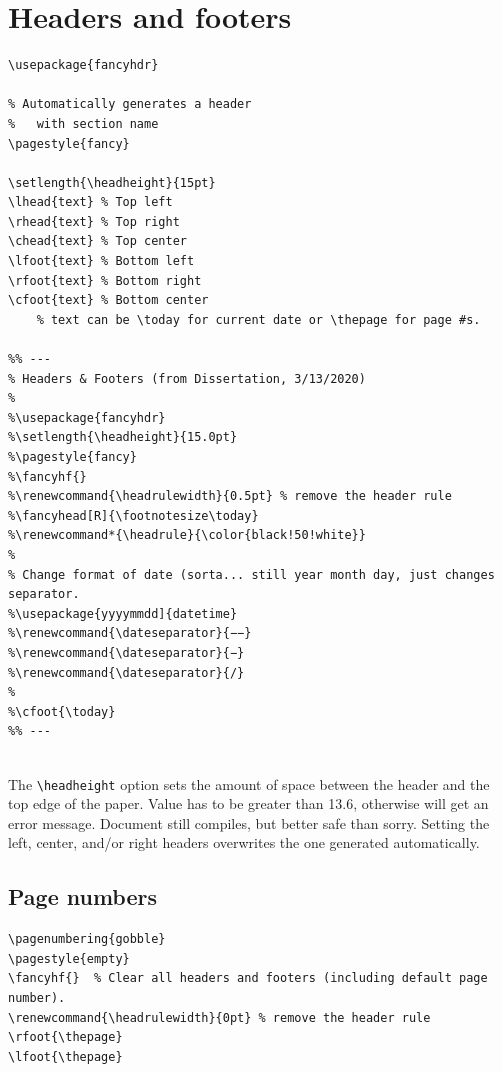 \documentclass{article}
\begin{document}
\section{Headers and footers}\label{headfoot}
\begin{minipage}{0.5\textwidth}
\begin{lstlisting}
\usepackage{fancyhdr}

% Automatically generates a header
%   with section name
\pagestyle{fancy}

\setlength{\headheight}{15pt}
\lhead{text} % Top left
\rhead{text} % Top right
\chead{text} % Top center
\lfoot{text} % Bottom left
\rfoot{text} % Bottom right
\cfoot{text} % Bottom center
    % text can be \today for current date or \thepage for page #s.

%% ---
% Headers & Footers (from Dissertation, 3/13/2020)
%
%\usepackage{fancyhdr}
%\setlength{\headheight}{15.0pt}
%\pagestyle{fancy}
%\fancyhf{}
%\renewcommand{\headrulewidth}{0.5pt} % remove the header rule
%\fancyhead[R]{\footnotesize\today}
%\renewcommand*{\headrule}{\color{black!50!white}}
%
% Change format of date (sorta... still year month day, just changes separator.
%\usepackage{yyyymmdd]{datetime}
%\renewcommand{\dateseparator}{−−}
%\renewcommand{\dateseparator}{−}
%\renewcommand{\dateseparator}{/}
%
%\cfoot{\today}
%% ---


\end{lstlisting}
\end{minipage}%
\begin{minipage}{0.5\textwidth}
    \begin{center}
        The \verb|\headheight| option sets the amount of space between the
        header and the top edge of the paper. Value has to be greater than
        13.6, otherwise will get an error message. Document still
        compiles, but better safe than sorry. Setting the left, center, and/or
        right headers overwrites the one generated automatically.
    \end{center}
\end{minipage}


\subsection{Page numbers}
\begin{lstlisting}
\pagenumbering{gobble}
\pagestyle{empty}
\fancyhf{}  % Clear all headers and footers (including default page number).
\renewcommand{\headrulewidth}{0pt} % remove the header rule
\rfoot{\thepage}
\lfoot{\thepage}
\end{lstlisting}
\end{document}
